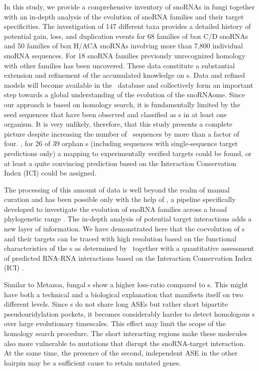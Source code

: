 
In this study, we provide a comprehensive inventory of snoRNAs in fungi
together with an in-depth analysis of the evolution of snoRNA families and
their target specificities. The investigation of 147 different taxa
provides a detailed history of potential gain, loss, and duplication events
for 68 families of box C/D snoRNAs and 50 families of box H/ACA snoRNAs
involving more than 7,800 individual snoRNA sequences. For 18 snoRNA
families previously unrecognized homology with other families has been
uncovered. These data constitute a substantial extension and refinement of
the accumulated knowledge on \sno{}s. Data and refined models will become
available in the \rfam\ database and collectively form an important step
towards a global understanding of the evolution of the snoRNAome. Since our
approach is based on homology search, it is fundamentally limited by the
seed sequences that have been observed and classified as \sno{}s in at
least one organism. It is very unlikely, therefore, that this study
presents a complete picture despite increasing the number of \sno\ sequences
by more than a factor of four. , for 26 of 39 orphan \sno
s (including sequences with single-sequence target predictions only) a
mapping to experimentally verified targets could be found, or at least a
quite convincing prediction based on the Interaction Conservation Index
(ICI) could be assigned.

The processing of this amount of data is well beyond the realm of manual
curation and has been possible only with the help of \snostrip, a pipeline
specifically developed to investigate the evolution of snoRNA families
across a broad phylogenetic range \cite{Bartschat:2014}.  The in-depth
analysis of potential target interactions adds a new layer of
information. We have demonstrated here that the coevolution of \sno s and
their targets can be traced with high resolution based on the functional
characteristics of the \sno s as determined by \snostrip\ together with a
quantitative assessment of predicted RNA-RNA interactions based on the 
Interaction Conservation Index (ICI) \cite{Kehr:2014}.

Similar to Metazoa, fungal \haca s show a higher loss-ratio compared
to \cd s. This might have both a technical and a biological
explanation that manifests itself on two different levels. Since \haca
s do not share long ASEs but rather short bipartite pseudouridylation
pockets, it becomes considerably harder to detect homologous \sno s
over large evolutionary timescales. This effect may limit the scope of
the homology search procedure. The short interacting regions make
these molecules also more vulnerable to mutations that disrupt the
snoRNA-target interaction. At the same time, the presence of the
second, independent ASE in the other hairpin may be a sufficient cause
to retain mutated genes.

